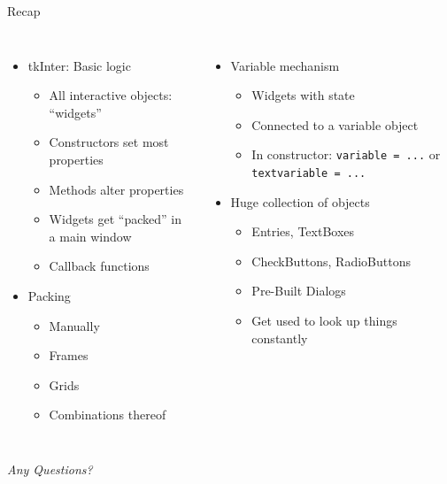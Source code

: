 
\begin{frame}[t,plain]
\titlepage
\end{frame}


\begin{frame}{Recap}
%
\begin{columns}[T]
\begin{itemize}
\item tkInter: Basic logic
	\begin{itemize}
	\item All interactive objects: \enquote{widgets}
	\item Constructors set most properties
	\item Methods alter properties
	\item Widgets get \enquote{packed} in a main window
	\item Callback functions
	\end{itemize}
\item Packing
	\begin{itemize}
	\item Manually
	\item Frames
	\item Grids
	\item Combinations thereof
	\end{itemize}
\end{itemize}
%
\begin{itemize}
\item Variable mechanism
	\begin{itemize}
	\item Widgets with state
	\item Connected to a variable object
	\item In constructor: \texttt{variable = ...} or \texttt{textvariable = ...}
	\end{itemize}
\item Huge collection of objects
	\begin{itemize}
	\item Entries, TextBoxes
	\item CheckButtons, RadioButtons
	\item Pre-Built Dialogs
	\item Get used to look up things constantly
	\end{itemize}
\end{itemize}

\end{columns}
%
\begin{center}
	\emph{Any Questions?}
\end{center}
%
\end{frame}

